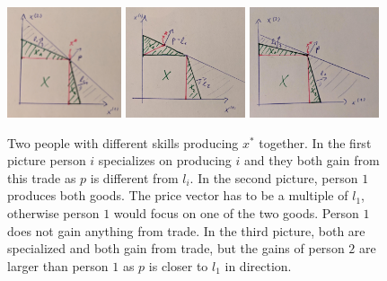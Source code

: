 \begin{figure}
	\includegraphics[width=0.3\textwidth]{images/2_people_trade_fair.jpeg}
	\includegraphics[width=0.315\textwidth]{images/2_people_trade_half_specialization.jpeg}
	\includegraphics[width=0.34\textwidth]{images/2_people_trade_unfair.jpeg}
	\caption{
		Two people with different skills producing \(x^*\) together. In the first
		picture person \(i\) specializes on producing \(i\) and they both gain
		from this trade as \(p\) is different from \(l_i\). In the second picture,
		person \(1\) produces both goods. The price vector has to be a multiple of
		\(l_1\), otherwise person \(1\) would focus on one of the two goods.
		Person \(1\) does not gain anything from trade. In the third picture, both
		are specialized and both gain from trade, but the gains of person \(2\)
		are larger than person \(1\) as \(p\) is closer to \(l_1\) in direction.
	}
\end{figure}

